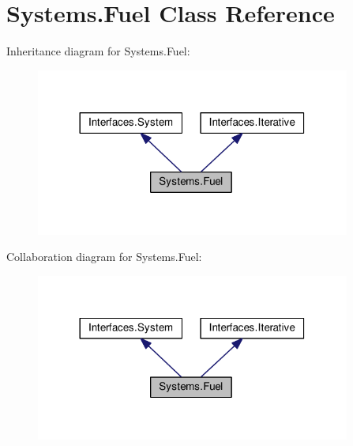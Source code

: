 \hypertarget{classSystems_1_1Fuel}{}\section{Systems.\+Fuel Class Reference}
\label{classSystems_1_1Fuel}


Inheritance diagram for Systems.\+Fuel\+:\nopagebreak
\begin{figure}[H]
\begin{center}
\leavevmode
\includegraphics[width=293pt]{classSystems_1_1Fuel__inherit__graph}
\end{center}
\end{figure}


Collaboration diagram for Systems.\+Fuel\+:\nopagebreak
\begin{figure}[H]
\begin{center}
\leavevmode
\includegraphics[width=293pt]{classSystems_1_1Fuel__coll__graph}
\end{center}
\end{figure}
